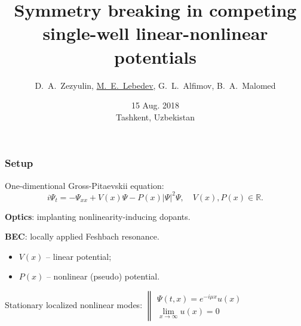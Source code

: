 \documentclass{beamer}
\begin{document}
\title{Symmetry breaking in competing single-well linear-nonlinear potentials}
\author{D.~A.~Zezyulin, \underline{M.~E.~Lebedev}, G.~L.~Alfimov, B.~A.~Malomed}
\date{15 Aug. 2018 \\ Tashkent, Uzbekistan}


\begin{frame}
\maketitle
\end{frame}


\begin{frame}
\frametitle{Setup}
One-dimentional Gross-Pitaevskii equation:
$$i\Psi_t = -\Psi_{xx} + V(x) \Psi - P(x) |\Psi|^2 \Psi, \quad V(x), P(x) \in \mathbb{R}.$$

{\bf Optics}: implanting nonlinearity-inducing dopants\footnotemark[1].

{\bf BEC}: locally applied Feshbach resonance\footnotemark[2].

\begin{itemize}
\item $V(x)$ -- linear potential;
\item $P(x)$ -- nonlinear (pseudo) potential.
\end{itemize}

\medskip

Stationary localized nonlinear modes: $\left\| \begin{array}{l} \Psi(t, x) = e^{-i \mu x} u(x) \\ \lim \limits_{x \to \infty} u(x) = 0 \end{array}\right.$

\end{frame}
\end{document}
